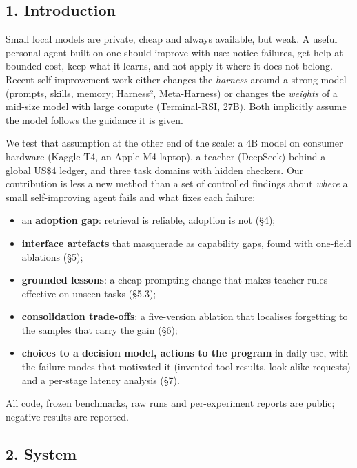 \documentclass[
  10pt,
]{article}
\providecommand{\tightlist}{%
  \setlength{\itemsep}{0pt}\setlength{\parskip}{0pt}}
\begin{document}
\subsection{1. Introduction}\label{introduction}

Small local models are private, cheap and always available, but weak. A
useful personal agent built on one should improve with use: notice
failures, get help at bounded cost, keep what it learns, and not apply
it where it does not belong. Recent self-improvement work either changes
the \emph{harness} around a strong model (prompts, skills, memory;
Harness², Meta-Harness) or changes the \emph{weights} of a mid-size
model with large compute (Terminal-RSI, 27B). Both implicitly assume the
model follows the guidance it is given.

We test that assumption at the other end of the scale: a 4B model on
consumer hardware (Kaggle T4, an Apple M4 laptop), a teacher (DeepSeek)
behind a global US\$4 ledger, and three task domains with hidden
checkers. Our contribution is less a new method than a set of controlled
findings about \emph{where} a small self-improving agent fails and what
fixes each failure:

\begin{itemize}
\tightlist
\item
  an \textbf{adoption gap}: retrieval is reliable, adoption is not (§4);
\item
  \textbf{interface artefacts} that masquerade as capability gaps, found
  with one-field ablations (§5);
\item
  \textbf{grounded lessons}: a cheap prompting change that makes teacher
  rules effective on unseen tasks (§5.3);
\item
  \textbf{consolidation trade-offs}: a five-version ablation that
  localises forgetting to the samples that carry the gain (§6);
\item
  \textbf{choices to a decision model, actions to the program} in daily
  use, with the failure modes that motivated it (invented tool results,
  look-alike requests) and a per-stage latency analysis (§7).
\end{itemize}

All code, frozen benchmarks, raw runs and per-experiment reports are
public; negative results are reported.

\subsection{2. System}\label{system}
\end{document}

